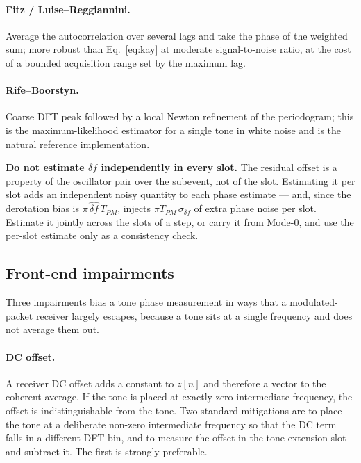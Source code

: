 \documentclass[11pt,a4paper]{article}
\newcommand{\Tpm}{T_{PM}}
\begin{document}
\paragraph{Fitz / Luise--Reggiannini.} Average the autocorrelation over several lags and take the
phase of the weighted sum; more robust than Eq.~\eqref{eq:kay} at moderate signal-to-noise ratio, at
the cost of a bounded acquisition range set by the maximum lag.

\paragraph{Rife--Boorstyn.} Coarse DFT peak followed by a local Newton refinement of the periodogram;
this is the maximum-likelihood estimator for a single tone in white noise and is the natural
reference implementation.

\begin{callout}
\textbf{Do not estimate $\delta f$ independently in every slot.} The residual offset is a property of
the oscillator pair over the subevent, not of the slot. Estimating it per slot adds an independent
noisy quantity to each phase estimate --- and, since the derotation bias is
$\pi\,\widehat{\delta f}\,\Tpm$, injects $\pi\Tpm\,\sigma_{\delta f}$ of extra phase noise per slot.
Estimate it jointly across the slots of a step, or carry it from Mode-0, and use the per-slot
estimate only as a consistency check.
\end{callout}

\subsection{Front-end impairments}

Three impairments bias a tone phase measurement in ways that a modulated-packet receiver largely
escapes, because a tone sits at a single frequency and does not average them out.

\paragraph{DC offset.} A receiver DC offset adds a constant to $z[n]$ and therefore a vector to the
coherent average. If the tone is placed at exactly zero intermediate frequency, the offset is
indistinguishable from the tone. Two standard mitigations are to place the tone at a deliberate
non-zero intermediate frequency so that the DC term falls in a different DFT bin, and to measure the
offset in the tone extension slot and subtract it. The first is strongly preferable.
\end{document}
